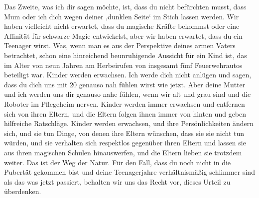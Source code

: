 \begin{writtenNote}
Das Zweite, was ich dir sagen möchte, ist, dass du nicht befürchten musst, dass Mum oder ich dich wegen deiner ‚dunklen Seite‘ im Stich lassen werden. Wir haben vielleicht nicht erwartet, dass du magische Kräfte bekommst oder eine Affinität für schwarze Magie entwickelst, aber wir haben erwartet, dass du ein Teenager wirst. Was, wenn man es aus der Perspektive deines armen Vaters betrachtet, schon eine hinreichend beunruhigende Aussicht für ein Kind ist, das im Alter von neun Jahren am Herbeirufen von insgesamt fünf Feuerwehrautos beteiligt war. Kinder werden erwachsen. Ich werde dich nicht anlügen und sagen, dass du dich uns mit 20 genauso nah fühlen wirst wie jetzt. Aber deine Mutter und ich werden uns dir genauso nahe fühlen, wenn wir alt und grau sind und die Roboter im Pflegeheim nerven. Kinder werden immer erwachsen und entfernen sich von ihren Eltern, und die Eltern folgen ihnen immer von hinten und geben hilfreiche Ratschläge. Kinder werden erwachsen, und ihre Persönlichkeiten ändern sich, und sie tun Dinge, von denen ihre Eltern wünschen, dass sie sie nicht tun würden, und sie verhalten sich respektlos gegenüber ihren Eltern und lassen sie aus ihren magischen Schulen hinauswerfen, und die Eltern lieben sie trotzdem weiter. Das ist der Weg der Natur. Für den Fall, dass du noch nicht in die Pubertät gekommen bist und deine Teenagerjahre verhältnismäßig schlimmer sind als das was jetzt passiert, behalten wir uns das Recht vor, dieses Urteil zu überdenken.


\end{writtenNote}

